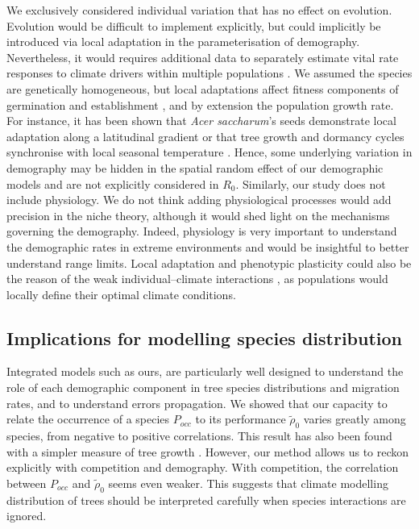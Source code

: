 We exclusively considered individual variation that has no effect on
evolution. Evolution would be difficult to implement explicitly, but could
implicitly be introduced via local adaptation in the parameterisation of
demography. Nevertheless, it would requires additional data to separately
estimate vital rate responses to climate drivers within multiple populations
\citep{Peterson2019}. We assumed the species are genetically homogeneous, but
local adaptations affect fitness components of germination and establishment
\citep{Alberto2013}, and by extension the population growth rate. For
instance, it has been shown that \textit{Acer saccharum}'s seeds demonstrate
local adaptation along a latitudinal gradient \citep{Solarik2016} or that tree
growth and dormancy cycles synchronise with local seasonal temperature
\citep{Aitken2008}. Hence, some underlying variation in demography may be
hidden in the spatial random effect of our demographic models and are not
explicitly considered in $ R_0 $. Similarly, our study does not include
physiology. We do not think adding physiological processes would add precision
in the niche theory, although it would shed light on the mechanisms governing
the demography. Indeed, physiology is very important to understand the
demographic rates in extreme environments \citep{Chaves2009} and would be
insightful to better understand range limits. Local adaptation and phenotypic
plasticity could also be the reason of the weak individual--climate
interactions \citep[and references therein]{Miner2005}, as populations would
locally define their optimal climate conditions.

\subsection{Implications for modelling species distribution}
Integrated models
such as ours, are particularly well designed to understand the role of each demographic component in tree
species distributions and migration rates, and to understand errors propagation. We showed that our capacity to
relate the occurrence of a species $ P_{occ} $ to its performance $ \tilde
\rho_0 $ varies greatly among species, from negative to positive correlations.
This result has also been found with a simpler measure of tree growth
\citep{McGill2012}. However, our method allows us to reckon explicitly with
competition and demography. With competition, the correlation between $
P_{occ} $ and $ \tilde \rho_0 $ seems even weaker. This suggests that climate
modelling distribution of trees should be interpreted carefully when species
interactions are ignored. \\


